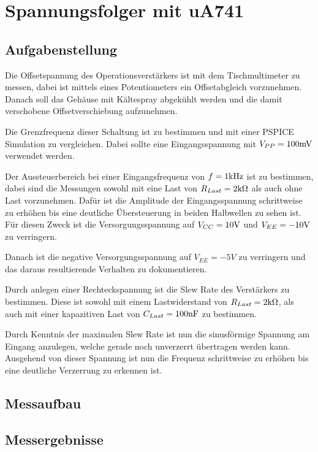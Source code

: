 \section{Spannungsfolger mit uA741}
\subsection{Aufgabenstellung}
Die Offsetspannung des Operationsverstärkers ist mit dem Tischmultimeter zu messen, dabei ist mittels eines Potentiometers ein Offsetabgleich vorzunehmen. Danach soll das Gehäuse mit Kältespray abgekühlt werden und die damit verschobene Offsetverschiebung aufzunehmen. 

Die Grenzfrequenz dieser Schaltung ist zu bestimmen und mit einer PSPICE Simulation zu vergleichen. Dabei sollte eine Eingangsspannung mit $V_{PP} = 100 \rm mV$ verwendet werden. 

Der Aussteuerbereich bei einer Eingangsfrequenz von $f=1 \rm kHz$ ist zu bestimmen, dabei sind die Messungen sowohl mit eine Last von $R_{Last} = 2 \rm k\Omega$ als auch ohne Last vorzunehmen. Dafür ist die Amplitude der Eingangsspannung schrittweise zu erhöhen bis eine deutliche Übersteuerung in beiden Halbwellen zu sehen ist. Für diesen Zweck ist die Versorgungsspannung auf $V_{CC} = 10\rm V$ und $V_{EE} = -10 \rm V$ zu verringern. 

Danach ist die negative Versorgungsspannung auf $V_{EE} = -5V$ zu verringern und das daraus resultierende Verhalten zu dokumentieren.

Durch anlegen einer Rechteckspannung ist die Slew Rate des Verstärkers zu bestimmen. Diese ist sowohl mit einem Lastwiderstand von $R_{Last} = 2\rm k\Omega$, als auch mit einer kapazitiven Last von $C_{Last} = 100 \rm nF$ zu bestimmen. 

Durch Kenntnis der maximalen Slew Rate ist nun die sinusförmige Spannung am Eingang anzulegen, welche gerade noch unverzerrt übertragen werden kann. Ausgehend von dieser Spannung ist nun die Frequenz schrittweise zu erhöhen bis eine deutliche Verzerrung zu erkennen ist. 

\subsection{Messaufbau}


\subsection{Messergebnisse}

